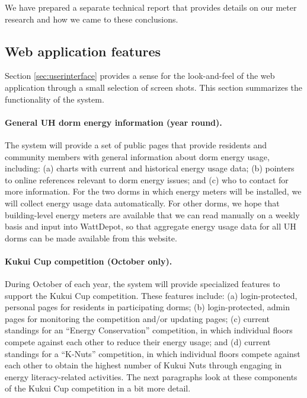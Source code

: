 \documentclass[11pt]{article}
\begin{document}
We have prepared a separate technical report \cite{Lim10} that provides details on our meter research and how we came to these conclusions. 

\subsection{Web application features}
\label{sec:features}

Section \ref{sec:userinterface} provides a sense for the look-and-feel of
the web application through a small selection of screen shots.  This section
summarizes the functionality of the system.

\paragraph{General UH dorm energy information (year round).}  The system will provide a set of public pages that provide residents and community members with general information about dorm energy usage, including: (a) charts with current and historical energy usage data; (b) pointers to online references relevant to dorm energy issues; and (c) who to contact for more information.  For the two dorms in which energy meters will be installed, we will collect energy usage data automatically.  For other dorms, we hope that building-level energy meters are available that we can read manually on a weekly basis and input into WattDepot, so that aggregate energy usage data for all UH dorms can be made available from this website.

\paragraph{Kukui Cup competition (October only).}  During October of each
year, the system will provide specialized features to support the Kukui Cup
competition.  These features include: (a) login-protected, personal pages
for residents in participating dorms; (b) login-protected, admin pages for
monitoring the competition and/or updating pages; (c) current standings for
an ``Energy Conservation'' competition, in which individual floors compete
against each other to reduce their energy usage; and (d) current standings
for a ``K-Nuts'' competition, in which individual floors compete against
each other to obtain the highest number of Kukui Nuts through engaging in
energy literacy-related activities.  The next paragraphs look at these
components of the Kukui Cup competition in a bit more detail.
 
\end{document}

